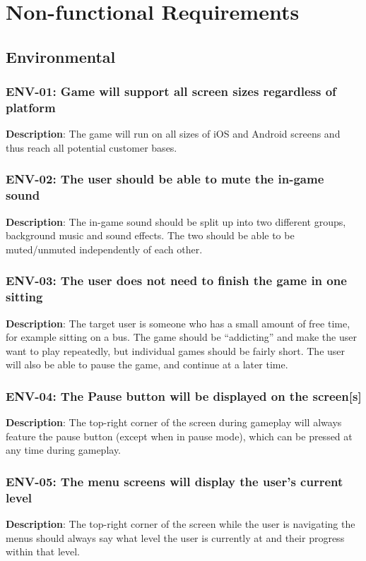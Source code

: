 \chapter{Non-functional Requirements}
\section{Environmental}
\subsection{ENV-01: Game will support all screen sizes regardless of platform}
\textbf{Description}: The game will run on all sizes of iOS and Android screens
and thus reach all potential customer bases.
\subsection{ENV-02: The user  should be able to mute the in-game sound }
\textbf{Description}: The in-game sound should be split up into two different
groups, background music and sound effects. The two should be able
to be muted/unmuted independently of each other.
\subsection{ENV-03: The user does not need to finish the game in one sitting}
\textbf{Description}: The target user is someone who has a small amount of
free time, for example sitting on a bus. The game should be \textquotedblleft{}addicting\textquotedblright{}
and make the user want to play repeatedly, but individual games should
be fairly short. The user will also be able to pause the game, and
continue at a later time.
\subsection{ENV-04: The Pause button will be displayed on the screen{[}s{]}}
\textbf{Description}: The top-right corner of the screen during gameplay will
always feature the pause button (except when in pause mode), which
can be pressed at any time during gameplay.
\subsection{ENV-05: The menu screens will display the user\textquoteright{}s
current level}
\textbf{Description}: The top-right corner of the screen while the user is
navigating the menus should always say what level the user is currently
at and their progress within that level.
